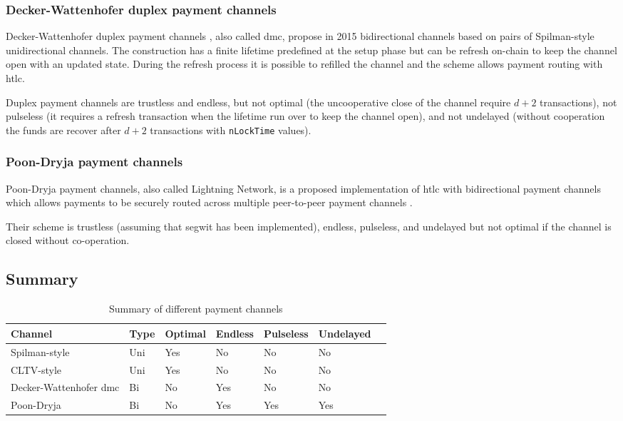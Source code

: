 \subsubsection{Decker-Wattenhofer duplex payment channels}

Decker-Wattenhofer duplex payment channels \cite{Decker2015fast}, also called
\gls{dmc}, propose in 2015 bidirectional channels based on pairs of Spilman-style
unidirectional channels. The construction has a finite lifetime predefined at the setup
phase but can be refresh on-chain to keep the channel open with an updated state. During the
refresh process it is possible to refilled the channel and the scheme allows payment routing
with \gls{htlc}.

Duplex payment channels are trustless and endless, but not optimal (the uncooperative close of the
channel require $d + 2$ transactions), not pulseless (it requires a refresh transaction
when the lifetime run over to keep the channel open), and not undelayed (without cooperation
the funds are recover after $d + 2$ transactions with \texttt{nLockTime} values).

\subsubsection{Poon-Dryja payment channels}

Poon-Dryja payment channels, also called Lightning Network, is a proposed implementation
of \gls{htlc} with bidirectional payment channels which allows payments to be securely
routed across multiple peer-to-peer payment channels \cite{poon2016bitcoin}.

Their scheme is trustless (assuming that \gls{segwit} has been implemented), endless,
pulseless, and undelayed but not optimal if the channel is closed without co-operation.

\subsection{Summary}

\begin{table}[h]
  \begin{tabularx}{\textwidth}{ | X | l | l | l | l | l | l |}
  \hline
  Channel & Type & Optimal & Endless & Pulseless & Undelayed \\ \hline \hline
  Spilman-style & Uni & Yes & No & No & No \\ \hline
  CLTV-style & Uni & Yes & No & No & No \\ \hline
  Decker-Wattenhofer \gls{dmc} & Bi & No & Yes & No & No \\ \hline
  Poon-Dryja & Bi & No & Yes & Yes & Yes \\
  \hline
  \end{tabularx}
  \caption{Summary of different payment channels}
  \label{fig:summaryPaymentChannel}
\end{table}

